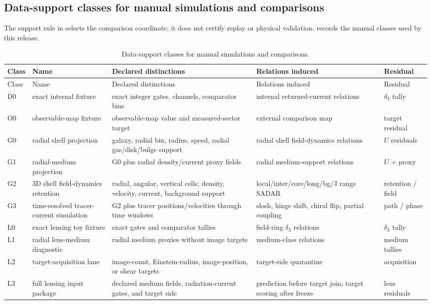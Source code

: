 \subsection{Data-support classes for manual simulations and comparisons}\label{manual:field-dynamics-data-support-classes}
The support rule in  selects the comparison coordinate; it does not certify replay or physical validation.  records the manual classes used by this release.

\scriptsize
\begin{longtable}{@{}p{}p{}p{}p{}p{}@{}}
\caption{Data-support classes for manual simulations and comparisons.}\label{tab:manual-data-support-classes}\\
\toprule
Class & Name & Declared distinctions & Relations induced & Residual\\
\midrule
\endfirsthead
\toprule
Class & Name & Declared distinctions & Relations induced & Residual\\
\midrule
\endhead
D0 & exact internal fixture & exact integer gates, channels, comparator bins & internal returned-current relations & \(\delta_3\) tally\\
O0 & observable-map fixture & observable-map value and measured-sector target & external comparison map & target residual\\
G0 & radial shell projection & galaxy, radial bin, radius, speed, radial gas/disk/bulge support & radial shell field-dynamics relations & \(U\) residuals\\
G1 & radial-medium projection & G0 plus radial density/current proxy fields & radial medium-support relations & \(U\) + proxy\\
G2 & 3D shell field-dynamics retention & radial, angular, vertical cells; density, velocity, current, background support & local/inter/core/long/bg/J range SADAR & retention / field\\
G3 & time-resolved tracer-current simulation & G2 plus tracer positions/velocities through time windows & slosh, hinge shift, chiral flip, partial coupling & path / phase\\
L0 & exact lensing toy fixture & exact gates and comparator tallies & field-ring \(\delta_3\) relations & \(\delta_3\) tally\\
L1 & radial lens-medium diagnostic & radial medium proxies without image targets & medium-class relations & medium tallies\\
L2 & target-acquisition lane & image-count, Einstein-radius, image-position, or shear targets & target-side quarantine & acquisition\\
L3 & full lensing input package & declared medium fields, radiation-current gates, and target side & prediction before target join; target scoring after freeze & lens residuals\\
\bottomrule
\end{longtable}
\normalsize


